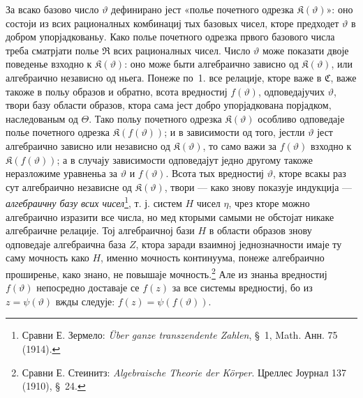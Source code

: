 ﻿\documentclass[11pt]{article}
\providecommand{\Cfield}{\mathfrak C}
\providecommand{\Kfield}{\mathfrak K}
\providecommand{\Rfield}{\mathfrak R}
\begin{document}
За всако базово число \(\vartheta\) дефинирано јест «полье почетного одрезка \(\Kfield(\vartheta)\)»: оно состоји из всих рационалных комбинациј тых базовых чисел, кторе предходет \(\vartheta\) в добром упорјадкованьу. Како полье почетного одрезка првого базового числа треба сматрјати полье \(\Rfield\) всих рационалных чисел. Число \(\vartheta\) може показати двоје поведенье взходно к \(\Kfield(\vartheta)\): оно може быти алгебраично зависно од \(\Kfield(\vartheta)\), или алгебраично независно од ньега. Понеже по~1. все релације, кторе важе в \(\Cfield\), важе такоже в польу образов и обратно, всота вредностиј \(f(\vartheta)\), одповедајучих \(\vartheta\), твори базу области образов, ктора сама јест добро упорјадкована порјадком, наследованым од \(\Theta\). Тако польу почетного одрезка \(\Kfield(\vartheta)\) особливо одповедаје полье почетного одрезка \(\Kfield(f(\vartheta))\); и в зависимости од того, јестли \(\vartheta\) јест алгебраично зависно или независно од \(\Kfield(\vartheta)\), то само важи за \(f(\vartheta)\) взходно к \(\Kfield(f(\vartheta))\); а в случају зависимости одповедајут једно другому такоже неразложиме уравненьа за \(\vartheta\) и \(f(\vartheta)\). Всота тых вредностиј \(\vartheta\), кторе всакы раз сут алгебраично независне од \(\Kfield(\vartheta)\), твори --- како знову показује индукција --- {\itshape алгебраичну базу всих чисел}\footnote{Сравни Е. Зермело: \emph{Über ganze transzendente Zahlen}, \S\ 1, Math. Анн. 75 (1914).}, т. ј. систем \(H\) чисел \(\eta\), чрез кторе можно алгебраично изразити все числа, но мед кторыми самыми не обстојат никаке алгебраичне релације. Тој алгебраичној бази \(H\) в области образов знову одповедаје алгебраична база \(Z\), ктора заради взаимној једнозначности имаје ту саму мочность како \(H\), именно мочность континуума, понеже алгебраично проширенье, како знано, не повышаје мочность.\footnote{Сравни Е. Стеинитз: \emph{Algebraische Theorie der Körper}. Цреллес Јоурнал 137 (1910), \S\ 24.} Але из знаньа вредностиј \(f(\vartheta)\) непосредно доставаје се \(f(z)\) за все системы вредностиј, бо из \(z=\psi(\vartheta)\) вжды следује: \(f(z)=\psi(f(\vartheta))\).
\end{document}
